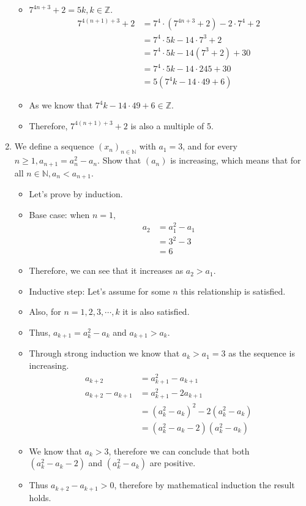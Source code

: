 \documentclass[letterpaper,12pt]{article}
\begin{document}
\begin{enumerate}
\begin{itemize}
	\item $7^{4n+3}+2 = 5k , k \in \mathbb{Z}$.
	\begin{align}
		7^{4(n+1)+3}+2 &= 7^4\cdot(7^{4n+3}+2)-2\cdot 7^4+2 \\
		&= 7^4 \cdot 5k -14 \cdot 7^3+2\\ 
		&= 7^4 \cdot 5k -14(7^3+2)+30 \\
		&=7^4\cdot 5k-14\cdot 245+30 \\
		&=5(7^4k-14\cdot49+6)
	\end{align}
	\item As we know that $7^4k-14\cdot49+6 \in \mathbb{Z}$.
	\item Therefore, $7^{4(n+1)+3}+2$ is also a multiple of 5.
	\end{itemize}
	
	\item We define a sequence $(x_n)_{n \in \mathbb{N}}$ with $a_1 =3 $, and for every $n \geq 1, a_{n+1} = a_n^2-a_n$. Show that $(a_n)$ is increasing, which means that for all $n \in \mathbb{N}, a_n<a_{n+1}$.
	\begin{itemize}
		\item Let's prove by induction.
		\item Base case: when $n=1$,
		\begin{align}
			a_2 &= a_1^2-a_1  \\ &=3^2-3 \\ &= 6
		\end{align}
	\item Therefore, we can see that it increases as $a_2>a_1$.
	\item Inductive step: Let's assume for some $n$ this relationship is satisfied.
	\item Also, for $n=1,2,3, \cdots ,k$ it is also satisfied.
	\item Thus, $a_{k+1} = a_k^2 -a_k$ and $a_{k+1} > a_k$.
	\item Through strong induction we know that $a_k > a_1 =3$ as the sequence is increasing.
	\begin{align}
		a_{k+2} &= a_{k+1}^2-a_{k+1} \\ a_{k+2}-a_{k+1} &= a_{k+1}^2-2a_{k+1} \\ &= (a_k^2-a_k)^2-2(a_k^2-a_k) \\ &= (a_k^2-a_k-2)(a_k^2-a_k)
	\end{align} 
	\item We know that $a_k >3 $, therefore we can conclude that both $(a_k^2-a_k-2)$ and $(a_k^2-a_k)$ are positive.
	\item Thus $a_{k+2} - a_{k+1} >0 $, therefore by mathematical induction the result holds.

\end{itemize}
\end{enumerate}
\end{document}
